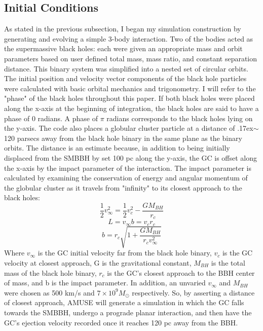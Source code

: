 \documentclass{aastex62}
\begin{document}
\subsection{Initial Conditions}
As stated in the previous subsection, I began my simulation construction by generating and evolving a simple 3-body interaction. Two of the bodies acted as the supermassive black holes: each were given an appropriate mass and orbit parameters based on user defined total mass, mass ratio, and constant separation distance. This binary system was simplified into a nested set of circular orbits. The initial position and velocity vector components of the black hole particles were calculated with basic orbital mechanics and trigonometry. I will refer to the "phase" of the black holes throughout this paper. If both black holes were placed along the x-axis at the beginning of integration, the black holes are said to have a phase of 0 radians. A phase of $\pi$ radians corresponds to the black holes lying on the y-axis. The code also places a globular cluster particle at a distance of {\raise.17ex\hbox{$\scriptstyle\mathtt{\sim}$}}120 parsecs away from the black hole binary in the same plane as the binary orbits. The distance is an estimate because, in addition to being initially displaced from the SMBBH by set 100 pc along the y-axis, the GC is offset along the x-axis by the impact parameter of the interaction. The impact parameter is calculated by examining the conservation of energy and angular momentum of the globular cluster as it travels from "infinity" to its closest approach to the black holes:
\begin{equation}
\frac{1}{2}v_{\infty}^2 = \frac{1}{2}v_{c}^2 - \frac{GM_{BH}}{r_{c}}
\end{equation}
\begin{equation}
L = v_{\infty}b = v_{c}r_{c}
\end{equation}
\begin{equation}
b = r_{c}\sqrt{1+\frac{GM_{BH}}{r_{c}v_{\infty}^2}}
\end{equation}
Where $v_{\infty}$ is the GC initial velocity far from the black hole binary, $v_{c}$ is the GC velocity at closest approach, G is the gravitational constant, $M_{BH}$ is the total mass of the black hole binary, $r_{c}$ is the GC's closest approach to the BBH center of mass, and b is the impact parameter.  In addition, an unvaried $v_{\infty}$ and $M_{BH}$ were chosen as 500 km/s and $7 \times 10^9 M_{\odot}$ respectively. So, by asserting a distance of closest approach, AMUSE will generate a simulation in which the GC falls towards the SMBBH, undergo a prograde planar interaction, and then have the GC's ejection velocity recorded once it reaches 120 pc away from the BBH. 
\end{document}
